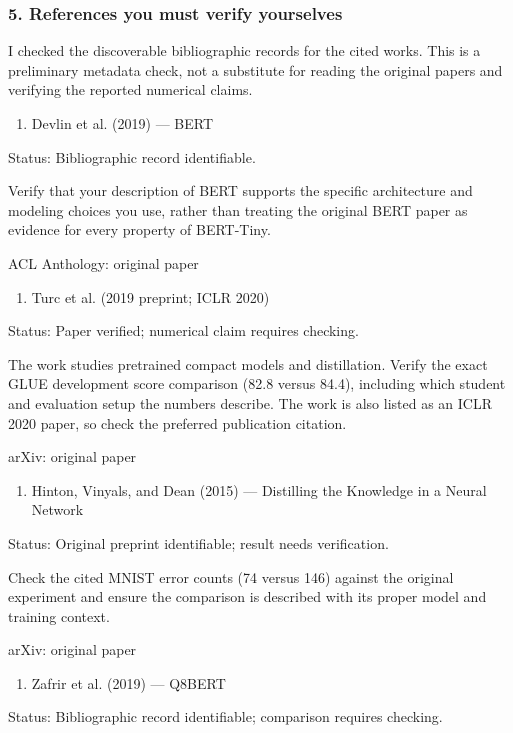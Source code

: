 \subsubsection*{5. References you must verify yourselves}
I checked the discoverable bibliographic records for the cited works. This is a preliminary metadata check, not a substitute for reading the original papers and verifying the reported numerical claims.

\begin{enumerate}
\item Devlin et al. (2019) — BERT
\end{enumerate}
Status: Bibliographic record identifiable.

Verify that your description of BERT supports the specific architecture and modeling choices you use, rather than treating the original BERT paper as evidence for every property of BERT-Tiny.

ACL Anthology: original paper

\begin{enumerate}
\item Turc et al. (2019 preprint; ICLR 2020)
\end{enumerate}
Status: Paper verified; numerical claim requires checking.

The work studies pretrained compact models and distillation. Verify the exact GLUE development score comparison (82.8 versus 84.4), including which student and evaluation setup the numbers describe. The work is also listed as an ICLR 2020 paper, so check the preferred publication citation.

arXiv: original paper

\begin{enumerate}
\item Hinton, Vinyals, and Dean (2015) — Distilling the Knowledge in a Neural Network
\end{enumerate}
Status: Original preprint identifiable; result needs verification.

Check the cited MNIST error counts (74 versus 146) against the original experiment and ensure the comparison is described with its proper model and training context.

arXiv: original paper

\begin{enumerate}
\item Zafrir et al. (2019) — Q8BERT
\end{enumerate}
Status: Bibliographic record identifiable; comparison requires checking.

